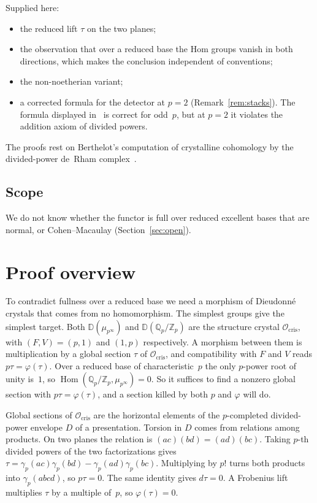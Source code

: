 \documentclass[11pt]{amsart}
\theoremstyle{remark}
\newcommand{\Zp}{\mathbb{Z}_p}
\newcommand{\Qp}{\mathbb{Q}_p}
\newcommand{\D}{\mathbb{D}}
\newcommand{\Ocris}{\mathcal{O}_{\mathrm{cris}}}
\newcommand{\Hom}{\operatorname{Hom}}
\newcommand{\mup}{\mu_{p^\infty}}
\newcommand{\QZ}{\Qp/\Zp}
\begin{document}
Supplied here:
\begin{itemize}
\item the reduced lift $\tau$ on the two planes;
\item the observation that over a reduced base the Hom groups vanish in both directions, which makes the conclusion
  independent of conventions;
\item the non-noetherian variant;
\item a corrected formula for the detector at $p=2$ (Remark~\ref{rem:stacks}). The formula displayed in~\cite{Stacks}
  is correct for odd~$p$, but at $p=2$ it violates the addition axiom of divided powers.
\end{itemize}
The proofs rest on Berthelot's computation of crystalline cohomology by the divided-power de~Rham
complex~\cite[Prop.~07LG]{Stacks}.

\subsection*{Scope} We do not know whether the functor is full over reduced excellent bases that are normal, or
Cohen--Macaulay (Section~\ref{sec:open}).

\section{Proof overview}

To contradict fullness over a reduced base we need a morphism of Dieudonn\'e crystals that comes from no homomorphism.
The simplest groups give the simplest target. Both $\D(\mup)$ and $\D(\QZ)$ are the structure crystal $\Ocris$, with
$(F,V)=(p,1)$ and $(1,p)$ respectively. A morphism between them is multiplication by a global section $\tau$ of
$\Ocris$, and compatibility with $F$ and $V$ reads $p\tau=\varphi(\tau)$. Over a reduced base of characteristic~$p$ the
only $p$-power root of unity is~$1$, so $\Hom(\QZ,\mup)=0$. So it suffices to find a nonzero global section with
$p\tau=\varphi(\tau)$, and a section killed by both $p$ and $\varphi$ will do.

Global sections of $\Ocris$ are the horizontal elements of the $p$-completed divided-power envelope $D$ of a
presentation. Torsion in $D$ comes from relations among products. On two planes the relation is
$(ac)(bd)=(ad)(bc)$. Taking $p$-th divided powers of the two factorizations gives
$\tau=\gamma_p(ac)\gamma_p(bd)-\gamma_p(ad)\gamma_p(bc)$. Multiplying by $p!$ turns both products into
$\gamma_p(abcd)$, so $p\tau=0$. The same identity gives $d\tau=0$. A Frobenius lift multiplies $\tau$ by a multiple
of~$p$, so $\varphi(\tau)=0$.
\end{document}
